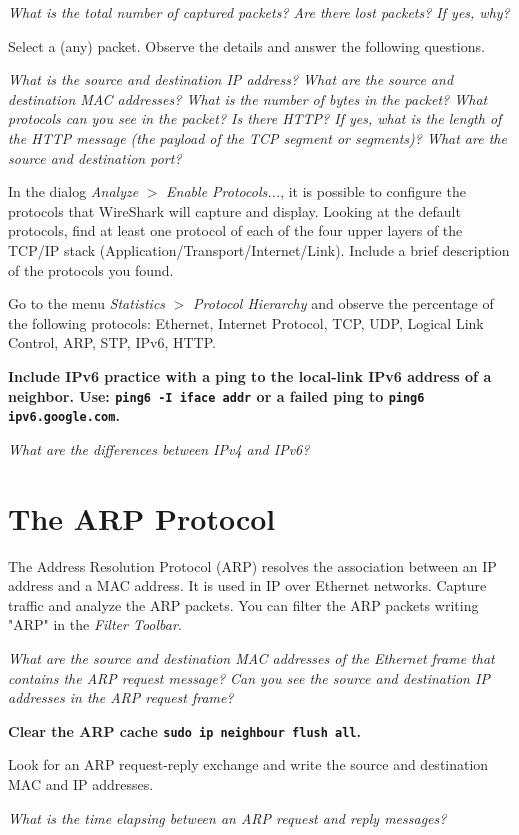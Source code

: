 \emph{What is the total number of captured packets? Are there lost packets? If yes, why?}

Select a (any) packet. Observe the details and answer the following questions.

\emph{What is the source and destination IP address? What are the source and destination MAC addresses? What is the number of bytes in the packet? What protocols can you see in the packet? Is there HTTP? If yes, what is the length of the HTTP message (the payload of the TCP segment or segments)? What are the source and destination port?}

In the dialog \emph{Analyze} $>$ \emph{Enable Protocols...}, it is possible to configure the protocols that WireShark will capture and display. Looking at the default protocols, find at least one protocol of each of the four upper layers of the TCP/IP stack (Application/Transport/Internet/Link). Include a brief description of the protocols you found.

Go to the menu \emph{Statistics} $>$ \emph{Protocol Hierarchy} and observe the percentage of the following protocols: Ethernet, Internet Protocol, TCP, UDP, Logical Link Control, ARP, STP, IPv6, HTTP.

\textbf{Include IPv6 practice with a ping to the local-link IPv6 address of a neighbor. Use: \texttt{ping6 -I iface addr} or a failed ping to \texttt{ping6 ipv6.google.com}.}

\emph{What are the differences between IPv4 and IPv6?}

\section{The ARP Protocol}

The Address Resolution Protocol (ARP) resolves the association between an IP address and a MAC address. It is used in IP over Ethernet networks. Capture traffic and analyze the ARP packets. You can filter the ARP packets writing "ARP" in the \emph{Filter Toolbar}.

\emph{What are the source and destination MAC addresses of the Ethernet frame that contains the ARP request message? Can you see the source and destination IP addresses in the ARP request frame?}

\textbf{Clear the ARP cache \texttt{sudo ip neighbour flush all}.}

Look for an ARP request-reply exchange and write the source and destination MAC and IP addresses.

\emph{What is the time elapsing between an ARP request and reply messages?}

